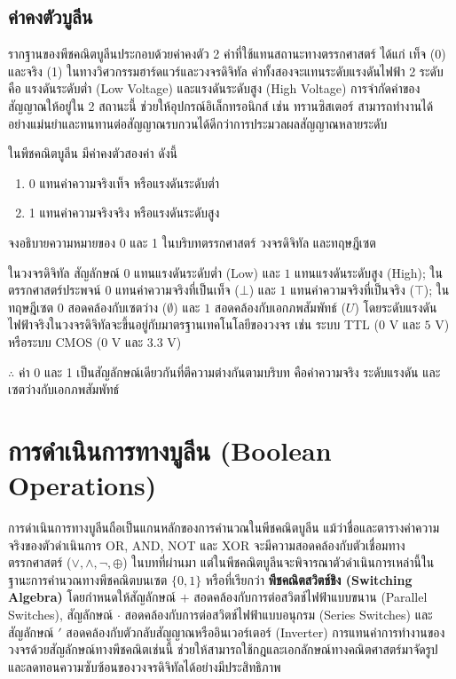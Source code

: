 \subsection{ค่าคงตัวบูลีน}
รากฐานของพีชคณิตบูลีนประกอบด้วยค่าคงตัว 2 ค่าที่ใช้แทนสถานะทางตรรกศาสตร์ ได้แก่ เท็จ (0) และจริง (1) ในทางวิศวกรรมฮาร์ดแวร์และวงจรดิจิทัล ค่าทั้งสองจะแทนระดับแรงดันไฟฟ้า 2 ระดับ คือ แรงดันระดับต่ำ (Low Voltage) และแรงดันระดับสูง (High Voltage) การจำกัดค่าของสัญญาณให้อยู่ใน 2 สถานะนี้ ช่วยให้อุปกรณ์อิเล็กทรอนิกส์ เช่น ทรานซิสเตอร์ สามารถทำงานได้อย่างแม่นยำและทนทานต่อสัญญาณรบกวนได้ดีกว่าการประมวลผลสัญญาณหลายระดับ~\parencite{mano2018digital}

\begin{definition}[ค่าคงตัวบูลีน]
ในพีชคณิตบูลีน มีค่าคงตัวสองค่า ดังนี้
\begin{enumerate}
    \item 0 แทนค่าความจริงเท็จ หรือแรงดันระดับต่ำ
    \item 1 แทนค่าความจริงจริง หรือแรงดันระดับสูง
\end{enumerate}
\end{definition}

\begin{ex}
\label{ex:bool-constants-meaning}
จงอธิบายความหมายของ 0 และ 1 ในบริบทตรรกศาสตร์ วงจรดิจิทัล และทฤษฎีเซต
\end{ex}
\begin{solution}
ในวงจรดิจิทัล สัญลักษณ์ $0$ แทนแรงดันระดับต่ำ (Low) และ $1$ แทนแรงดันระดับสูง (High); ในตรรกศาสตร์ประพจน์ $0$ แทนค่าความจริงที่เป็นเท็จ ($\bot$) และ $1$ แทนค่าความจริงที่เป็นจริง ($\top$); ในทฤษฎีเซต $0$ สอดคล้องกับเซตว่าง ($\emptyset$) และ $1$ สอดคล้องกับเอกภพสัมพัทธ์ ($U$) โดยระดับแรงดันไฟฟ้าจริงในวงจรดิจิทัลจะขึ้นอยู่กับมาตรฐานเทคโนโลยีของวงจร เช่น ระบบ TTL ($0\text{ V}$ และ $5\text{ V}$) หรือระบบ CMOS ($0\text{ V}$ และ $3.3\text{ V}$)

$\therefore$ ค่า 0 และ 1 เป็นสัญลักษณ์เดียวกันที่ตีความต่างกันตามบริบท คือค่าความจริง ระดับแรงดัน และเซตว่างกับเอกภพสัมพัทธ์ \solhere
\end{solution}

\section{การดำเนินการทางบูลีน (Boolean Operations)}
\label{sec:boolean-operations}

การดำเนินการทางบูลีนถือเป็นแกนหลักของการคำนวณในพีชคณิตบูลีน แม้ว่าชื่อและตารางค่าความจริงของตัวดำเนินการ OR, AND, NOT และ XOR จะมีความสอดคล้องกับตัวเชื่อมทางตรรกศาสตร์ ($\lor, \land, \neg, \oplus$) ในบทที่ผ่านมา แต่ในพีชคณิตบูลีนจะพิจารณาตัวดำเนินการเหล่านี้ในฐานะการคำนวณทางพีชคณิตบนเซต $\{0, 1\}$ หรือที่เรียกว่า \textbf{พีชคณิตสวิตช์ชิง (Switching Algebra)} โดยกำหนดให้สัญลักษณ์ $+$ สอดคล้องกับการต่อสวิตช์ไฟฟ้าแบบขนาน (Parallel Switches), สัญลักษณ์ $\cdot$ สอดคล้องกับการต่อสวิตช์ไฟฟ้าแบบอนุกรม (Series Switches) และสัญลักษณ์ $'$ สอดคล้องกับตัวกลับสัญญาณหรืออินเวอร์เตอร์ (Inverter) การแทนค่าการทำงานของวงจรด้วยสัญลักษณ์ทางพีชคณิตเช่นนี้ ช่วยให้สามารถใช้กฎและเอกลักษณ์ทางคณิตศาสตร์มาจัดรูปและลดทอนความซับซ้อนของวงจรดิจิทัลได้อย่างมีประสิทธิภาพ~\parencite{mano2018digital}

